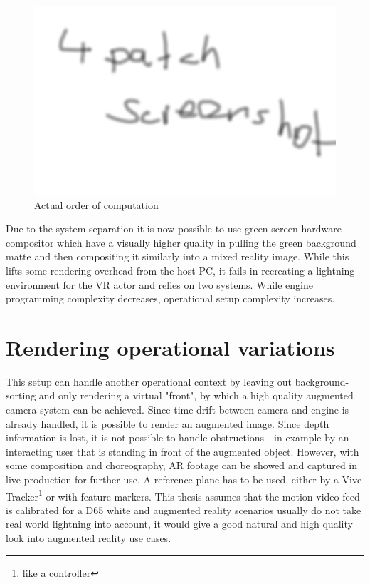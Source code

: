 \begin{figure}[htb]
	\includegraphics[width=\textwidth]{_raw_resources/4patch_composite.png}
	\caption{Actual order of computation}
	\label{fig:alt-render:4patch}
\end{figure}

Due to the system separation it is now possible to use green screen hardware 
compositor which have a visually higher quality in pulling the green background 
matte and then compositing it similarly into a mixed reality image. While this 
lifts some rendering overhead from the host PC, it fails in recreating a 
lightning environment for the VR actor and relies on two systems. While engine 
programming complexity decreases, operational setup complexity increases.

\section{Rendering operational variations}

This setup can handle another operational context by leaving out 
background-sorting and only rendering a virtual "front", by which a high 
quality augmented camera system can be achieved. Since time drift between 
camera and engine is already handled, it is possible to render an augmented 
image. Since depth information is lost, it is not possible to handle 
obstructions - in example by an interacting user that is standing in front of 
the augmented object. However, with some composition and choreography, AR 
footage can be showed and captured in live production for further use. A 
reference plane has to be used, either by a Vive Tracker\footnote{like a 
controller} or with feature markers.
\newline
This thesis assumes that the motion video feed is calibrated for a D65 white 
and augmented reality scenarios usually do not take real world lightning into 
account, it would give a good natural and high quality look into augmented 
reality use cases.

